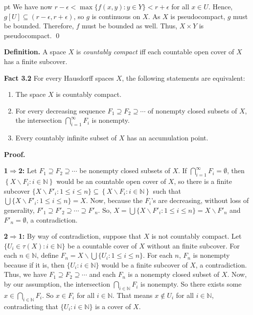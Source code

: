 \documentclass{article}
\begin{document}
 pt
We have now $r-\epsilon<\max\{f(x,y):y\in Y\}<r+\epsilon$ for all $x\in U$. Hence, $g[U] \subseteq (r-\epsilon, r+\epsilon)$, so $g$ is continuous on $X$. 
As $X$ is pseudocompact, $g$ must be bounded. Therefore, $f$ must be bounded as well. 
Thus, $X\times Y$ is pseudocompact. \qed


\vskip 40pt 





\textbf{Definition. } A space $X$ is \emph{countably compact} iff each countable open cover of $X$ has a finite subcover.


\vskip 30pt

\textbf{Fact 3.2} For every Hausdorff spaces $X$, the following statements are equivalent: \vskip 5pt
\begin{enumerate}
	\item  The space $X$ is countably compact.
	\item For every decreasing sequence $F_1\supseteq F_2 \supseteq \cdots $ of nonempty closed subsets of $X$, the intersection $\bigcap_{i=1}^{\infty} F_i$ is nonempty. 
	\item Every countably infinite subset of $X$ has an accumulation point. 
\end{enumerate}
\vskip 15pt
\textbf{Proof.} \vskip 10pt

\textbf{1$\Rightarrow $2:} Let $F_1\supseteq F_2 \supseteq \cdots $ be nonempty closed subsets of $X$. If $\bigcap_{i=1}^{\infty} F_i =\emptyset$, then $\left\{X\backslash F_i : i\in \mathbb{N} \right\} $ would be an countable open cover of $X$, so there is a finite subcover $\{X\backslash F'_i : 1\leq i \leq n\} \subseteq \left\{X\backslash F_i : i\in \mathbb{N}\right\}$ such that $\bigcup \{X\backslash F'_i : 1\leq i \leq n\}= X$. Now, because the $F_i$'s are decreasing, without loss of generality, $F'_1 \supseteq F'_2 \supseteq \cdots \supseteq F'_n$. So, $X=\bigcup \{X\backslash F'_i : 1\leq i \leq n\}= X\backslash F'_n$ and $F'_n=\emptyset$, a contradiction.


\vskip 10pt

\textbf{2$\Rightarrow $1:} By way of contradiction, suppose that $X$ is not countably compact.
Let $\{U_i\in \tau(X): i\in \mathbb{N}\}$ be a countable cover of $X$ without an finite subcover. For each $n\in \mathbb{N}$, define $F_n=X\backslash \bigcup\{U_i: 1\leq i\leq n\}.$ For each $n$, $F_n$ is nonempty because if it is, then $\{U_i: i\in \mathbb{N}\}$ would be a finite subcover of $X$, a contradiction. Thus, we have $F_1\supseteq F_2 \supseteq \cdots $ and each $F_n$ is a nonempty closed subset of $X$. 
\vskip 10pt
Now, by our assumption, the intersection $\bigcap_{i \in \mathbb{N}} F_i$ is nonempty. So there exists some $x\in \bigcap_{i\in \mathbb{N}} F_i$. So $x\in F_i$ for all $i\in \mathbb{N}$. That means $x\notin U_i$ for all $i\in \mathbb{N}$, contradicting that $\{U_i: i\in \mathbb{N}\}$ is a cover of $X$. 
\end{document}
